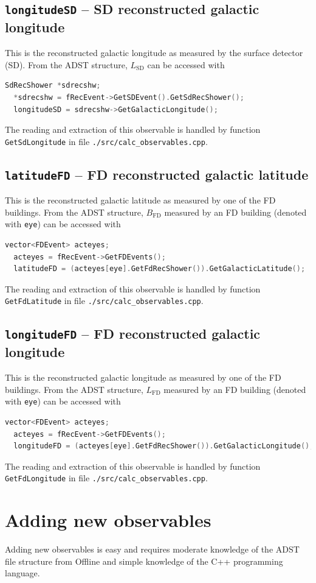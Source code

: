 \documentclass[12pt,a4paper]{report}
\begin{document}
\subsection{\texttt{longitudeSD} -- SD reconstructed galactic longitude}
This is the reconstructed galactic longitude as measured by the surface detector (SD). From the ADST structure, $L_{\textrm{SD}}$ can be accessed with
\begin{lstlisting}[language=C++]
  SdRecShower *sdrecshw;
  *sdrecshw = fRecEvent->GetSDEvent().GetSdRecShower();
  longitudeSD = sdrecshw->GetGalacticLongitude();
\end{lstlisting}
The reading and extraction of this observable is handled by function \texttt{GetSdLongitude} in file \texttt{./src/calc\_observables.cpp}.

\subsection{\texttt{latitudeFD} -- FD reconstructed galactic latitude}
This is the reconstructed galactic latitude as measured by one of the FD buildings. From the ADST structure, $B_{\textrm{FD}}$ measured by an FD building (denoted with \texttt{eye}) can be accessed with
\begin{lstlisting}[language=C++]
  vector<FDEvent> acteyes;
  acteyes = fRecEvent->GetFDEvents();
  latitudeFD = (acteyes[eye].GetFdRecShower()).GetGalacticLatitude();
\end{lstlisting}
The reading and extraction of this observable is handled by function \texttt{GetFdLatitude} in file \texttt{./src/calc\_observables.cpp}.
\subsection{\texttt{longitudeFD} -- FD reconstructed galactic longitude}
This is the reconstructed galactic longitude as measured by one of the FD buildings. From the ADST structure, $L_{\textrm{FD}}$ measured by an FD building (denoted with \texttt{eye}) can be accessed with
\begin{lstlisting}[language=C++]
  vector<FDEvent> acteyes;
  acteyes = fRecEvent->GetFDEvents();
  longitudeFD = (acteyes[eye].GetFdRecShower()).GetGalacticLongitude();
\end{lstlisting}
The reading and extraction of this observable is handled by function \texttt{GetFdLongitude} in file \texttt{./src/calc\_observables.cpp}.

\section{Adding new observables} \label{ch:add-obs}
Adding new observables is easy and requires moderate knowledge of the ADST file structure from Offline and simple knowledge of the C++ programming language.
\end{document}
